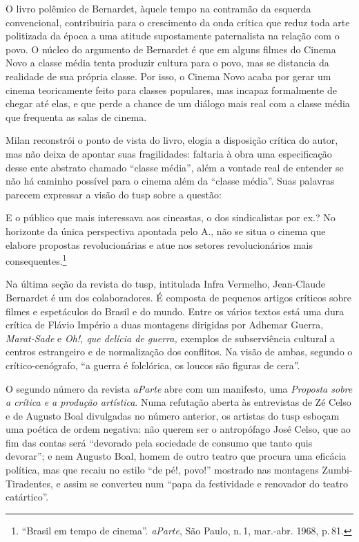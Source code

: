 O livro polêmico de Bernardet, àquele tempo na contramão da esquerda
convencional, contribuiria para o crescimento da onda crítica que reduz
toda arte politizada da época a uma atitude supostamente paternalista na
relação com o povo. O núcleo do argumento de Bernardet é que em alguns
filmes do Cinema Novo a classe média tenta produzir cultura para o povo,
mas se distancia da realidade de sua própria classe. Por isso, o Cinema
Novo acaba por gerar um cinema teoricamente feito para classes
populares, mas incapaz formalmente de chegar até elas, e que perde a
chance de um diálogo mais real com a classe média que frequenta as salas
de cinema.

Milan reconstrói o ponto de vista do livro, elogia a disposição crítica
do autor, mas não deixa de apontar suas fragilidades: faltaria à obra
uma especificação desse ente abstrato chamado “classe média”, além a
vontade real de entender se não há caminho possível para o cinema além
da “classe média”. Suas palavras parecem expressar a visão do {\sc tusp} sobre
a questão:

\startblockquote
E o público que mais interessava aos cineastas, o dos sindicalistas por
ex.? No horizonte da única perspectiva apontada pelo A., não se situa o
cinema que elabore propostas revolucionárias e atue nos setores
revolucionários mais consequentes.\footnote{“Brasil em tempo de cinema”.
  {\it aParte}, São Paulo, n.\,1, mar.-abr. 1968, p.\,81.}
\stopblockquote

Na última seção da revista do {\sc tusp}, intitulada Infra Vermelho,
Jean-Claude Bernardet é um dos colaboradores. É composta de pequenos
artigos críticos sobre filmes e espetáculos do Brasil e do mundo. Entre
os vários textos está uma dura crítica de Flávio Império a duas
montagens dirigidas por Adhemar Guerra, {\it Marat-Sade} e {\it Oh!, que
delícia de guerra,} exemplos de subserviência cultural a centros
estrangeiro e de normalização dos conflitos. Na visão de ambas, segundo
o crítico-cenógrafo, “a guerra é folclórica, os loucos são figuras de
cera”.


O segundo número da revista {\it aParte} abre com um manifesto, uma
{\it Proposta sobre a crítica e a produção artística}. Numa refutação
aberta às entrevistas de Zé Celso e de Augusto Boal divulgadas no número
anterior, os artistas do {\sc tusp} esboçam uma poética de ordem negativa: não
querem ser o antropófago José Celso, que ao fim das contas será
“devorado pela sociedade de consumo que tanto quis devorar”; e nem
Augusto Boal, homem de outro teatro que procura uma eficácia política,
mas que recaiu no estilo “de pé!, povo!” mostrado nas montagens
Zumbi-Tiradentes, e assim se converteu num “papa da festividade e
renovador do teatro catártico”.


